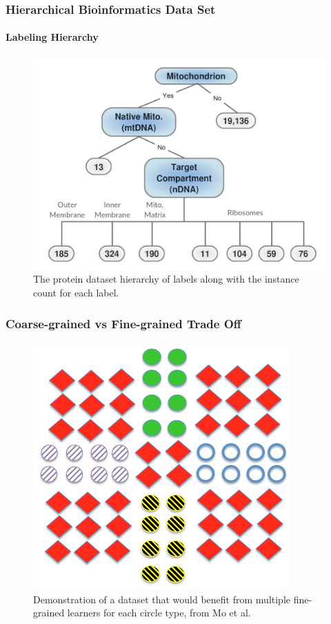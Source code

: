 \documentclass{beamer}
\begin{document}
\begin{frame}
\begin{table}[H]
{\begin{tabular}{|c|c|c|}
      \end{tabular} }
    \end{table}
\end{frame}
\begin{frame}
    \frametitle{Hierarchical Bioinformatics Data Set}
    \framesubtitle{Labeling Hierarchy}
    \begin{figure}[!htb]
        \centering
    \includegraphics[width=0.75\columnwidth]{fig/MitoTreeLabels}
        \caption{The protein dataset hierarchy of labels along with the instance
        count for each label.}
        \label{fig:Mitotree}
    \end{figure}
\end{frame}
\begin{frame}
    \frametitle{Coarse-grained vs Fine-grained Trade Off}
    \framesubtitle{}
    \begin{figure}[!htb]
	\centering
    \includegraphics[width=0.5\columnwidth]{fig/union}
    \caption{Demonstration of a dataset that would benefit from multiple fine-grained
    learners for each circle type, from Mo et al.}
    \label{fig:union}
\end{figure}
\end{frame}
\end{document}
